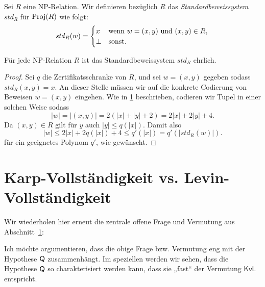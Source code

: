 \begin{definition}[Standardbeweissystem]
    Sei $R$ eine NP-Relation. Wir definieren bezüglich $R$ das \emph{Standardbeweissystem} $\mathit{std}_R$ für $\operatorname{Proj}(R)$ wie folgt:
    \[ \mathit{std}_R(w) = \begin{cases} x & \text{wenn $w=(x,y)$ und $(x,y)\in R$,}\\
    \bot & \text{sonst}.\end{cases} \qedhere \] 
\end{definition}
\begin{observation}\label{obs:spps-honest}
    Für jede NP-Relation $R$ ist das Standardbeweissystem $\mathit{std}_R$ ehrlich.
\end{observation}
\begin{proof}
    Sei $q$ die Zertifikatsschranke von $R$, und sei $w=(x,y)$ gegeben sodass $\mathit{std}_R(x,y) = x$.
    An dieser Stelle müssen wir auf die konkrete Codierung von Beweisen $w=(x,y)$ eingehen.
    Wie in \ref{} beschrieben, codieren wir Tupel in einer solchen Weise sodass
    \[ |w| = |(x,y)| = 2(|x|+|y|+2) = 2|x|+ 2|y| + 4. \]
    Da $(x,y)\in R$ gilt für $y$ auch $|y|\leq q(|x|)$.
    Damit also
    \[ |w| \leq 2|x|+ 2q(|x|) + 4 \leq q'(|x|) = q'(|\mathit{std}_R(w)|). \]
    für ein geeignetes Polynom $q'$, wie gewünscht.
\end{proof}


\section{Karp-Vollständigkeit vs. Levin-Vollständigkeit}

Wir wiederholen hier erneut die zentrale offene Frage und Vermutung aus Abschnitt~\ref{}:

\questionkvl

\conjkvl

Ich möchte argumentieren, dass die obige Frage bzw. Vermutung eng mit der Hypothese $\mathsf{Q}$ zusammenhängt.
Im speziellen werden wir sehen, dass die Hypothese $\mathsf{Q}$ so charakterisiert werden kann, dass sie „fast“ der Vermutung $\mathsf{KvL}$ entspricht.

